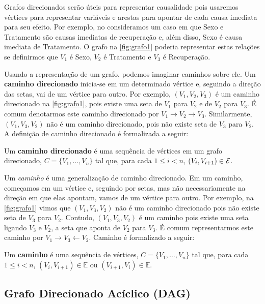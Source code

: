 Grafos direcionados serão úteis para 
representar causalidade pois 
usaremos vértices para representar variáveis e
arestas para apontar de 
cada causa imediata para seu efeito.
Por exemplo, no 
consideramos um caso em que Sexo e Tratamento são
causas imediatas de recuperação e, além disso,
Sexo é causa imediata de Tratamento.
O grafo na \cref{fig:grafo1} poderia
representar estas relações se definirmos que
$V_1$ é Sexo, $V_2$ é Tratamento e 
$V_3$ é Recuperação.

Usando a representação de um grafo,
podemos imaginar caminhos sobre ele.
Um \textbf{caminho direcionado} inicia-se 
em um determinado vértice e, 
seguindo a direção das setas, 
vai de um vértice para outro.
Por exemplo, $(V_1, V_2, V_3)$ é
um caminho direcionado na 
\cref{fig:grafo1}, pois existe
uma seta de $V_1$ para $V_2$ e
de $V_2$ para $V_3$.
É comum denotarmos este caminho direcionado por
$V_1 \rightarrow V_2 \rightarrow V_3$.
Similarmente, $(V_1, V_3, V_2)$ não é
um caminho direcionado, pois
não existe seta de $V_3$ para $V_2$.
A definição de caminho direcionado é
formalizada a seguir:

\begin{definition}
 \label{lem:caminhodir}
 Um \textbf{caminho direcionado} é 
 uma sequência de vértices em
 um grafo direcionado,
 $C = \{V_1, \ldots, V_n\}$ tal que, 
 para cada $1 \leq i < n$,
 $(V_i, V_{i+1}) \in {\mathcal E}$.
\end{definition}

Um \textit{caminho} é uma generalização 
de caminho direcionado.
Em um caminho, começamos em um vértice e,
seguindo por setas, mas 
não necessariamente na direção 
em que elas apontam, vamos
de um vértice para outro.
Por exemplo, na \cref{fig:grafo1}
vimos que $(V_1, V_3, V_2)$ não é um 
caminho direcionado pois não existe seta de $V_3$ para $V_2$.
Contudo, $(V_1, V_3, V_2)$ é um caminho pois
existe uma seta ligando $V_3$ e $V_2$,
a seta que aponta de $V_2$ para $V_3$.
É comum representarmos este caminho por
$V_1 \rightarrow V_3 \leftarrow V_2$.
Caminho é formalizado a seguir:

\begin{definition}
 \label{def:caminho}
 Um \textbf{caminho} é uma sequência de vértices,
 $C = \{V_1, \ldots, V_n\}$ tal que, 
 para cada $1 \leq i < n$,
 $(V_i, V_{i+1}) \in \mathbb{E}$ ou 
 $(V_{i+1}, V_{i}) \in \mathbb{E}$. 
\end{definition}

\subsection{Grafo Direcionado Acíclico (DAG)}

